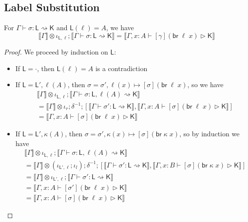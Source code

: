 \documentclass[acmsmall,screen,review]{acmart}
\newcommand{\ms}[1]{\ensuremath{\mathsf{#1}}}
\newcommand{\brb}[2]{\ms{br}\;#1\;#2}
\newcommand{\bhyp}[2]{#1 : #2}
\newcommand{\haslb}[3]{#1 \vdash #2 \rhd #3}
\newcommand{\lbsubst}[4]{#1 \vdash #2: #3 \rightsquigarrow #4}
\newcommand{\dnt}[1]{\llbracket{#1}\rrbracket}
\begin{document}
\subsection{Label Substitution}

\begin{lemma}
  For $\lbsubst{\Gamma}{\sigma}{\ms{L}}{\ms{K}}$ and $\ms{L}(\ell) = A$, we have
  \begin{equation}
    \dnt{\Gamma} \otimes \iota_{\ms{L}, \ell} ; \dnt{\lbsubst{\Gamma}{\sigma}{\ms{L}}{\ms{K}}}
    = \dnt{\haslb{\Gamma, x : A}{[\gamma](\brb{\ell}{x})}{\ms{K}}}
  \end{equation}
  \label{lem:lsubst-inj}
\end{lemma}

\begin{proof}
  We proceed by induction on $\ms{L}$:
  \begin{itemize}[leftmargin=*]
    \item If $\ms{L} = \cdot$, then $\ms{L}(\ell) = A$ is a contradiction
    \item If $\ms{L} = \ms{L}', \ell(A)$, then 
    $\sigma = \sigma', \ell(x) \mapsto [\sigma](\brb{\ell}{x})$, so we have
    \begin{equation}
      \begin{aligned}
      & \dnt{\Gamma} \otimes \iota_{\ms{L}, \ell} 
        ; \dnt{\lbsubst{\Gamma}{\sigma}{\ms{L}, \ell(A)}{\ms{K}}} \\
      & = \dnt{\Gamma} \otimes \iota_r ; \delta^{-1} ; [
          \dnt{\lbsubst{\Gamma}{\sigma'}{\ms{L}}{\ms{K}}},
          \dnt{\haslb{\Gamma, \bhyp{x}{A}}{[\sigma](\brb{\ell}{x})}{\ms{K}}}
        ] \\
      & = \dnt{\haslb{\Gamma, \bhyp{x}{A}}{[\sigma](\brb{\ell}{x})}{\ms{K}}}
      \end{aligned}
    \end{equation}
    \item If $\ms{L} = \ms{L}', \kappa(A)$, then 
    $\sigma = \sigma', \kappa(x) \mapsto [\sigma](\brb{\kappa}{x})$, so by
    induction we have
    \begin{equation}
      \begin{aligned}
      & \dnt{\Gamma} \otimes \iota_{\ms{L}, \ell} 
        ; \dnt{\lbsubst{\Gamma}{\sigma}{\ms{L}, \ell(A)}{\ms{K}}} \\
      & = \dnt{\Gamma} \otimes (\iota_{\ms{L}', \ell} ; \iota_l) ; \delta^{-1} ; [
          \dnt{\lbsubst{\Gamma}{\sigma'}{\ms{L}}{\ms{K}}},
          \dnt{\haslb{\Gamma, \bhyp{x}{B}}{[\sigma](\brb{\kappa}{x})}{\ms{K}}}
        ] \\
      & = \dnt{\Gamma} \otimes \iota_{\ms{L}', \ell} 
        ; \dnt{\lbsubst{\Gamma}{\sigma'}{\ms{L}}{\ms{K}}} \\
      & = \dnt{\haslb{\Gamma, \bhyp{x}{A}}{[\sigma'](\brb{\ell}{x})}{\ms{K}}} \\
      & = \dnt{\haslb{\Gamma, \bhyp{x}{A}}{[\sigma](\brb{\ell}{x})}{\ms{K}}}
      \end{aligned}
    \end{equation}
  \end{itemize}
\end{proof}
\end{document}
